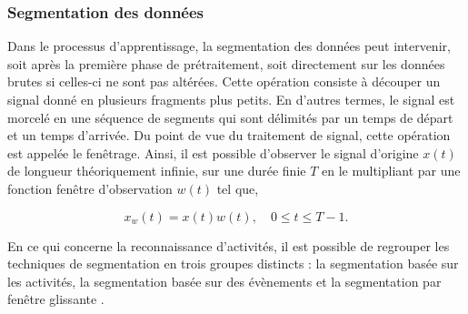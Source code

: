\subsubsection{Segmentation des données}

Dans le processus d'apprentissage, la segmentation des données peut intervenir, soit après la première phase de prétraitement, soit directement sur les données brutes si celles-ci ne sont pas altérées. Cette opération consiste à découper un signal donné en plusieurs fragments plus petits. En d'autres termes, le signal est morcelé en une séquence de segments qui sont délimités par un temps de départ et un temps d'arrivée. Du point de vue du traitement de signal, cette opération est appelée le fenêtrage. Ainsi, il est possible d'observer le signal d'origine $x\left(t\right)$ de longueur théoriquement infinie, sur une durée finie $T$ en le multipliant par une fonction fenêtre d'observation $w\left(t\right)$ tel que,




\begin{equation}
    x_w\left(t\right) = x\left(t\right)w\left(t\right), \quad 0 \leq t \leq T - 1 .
\end{equation}

En ce qui concerne la reconnaissance d'activités, il est possible de regrouper les techniques de segmentation en trois groupes distincts : la segmentation basée sur les activités, la segmentation basée sur des évènements et la segmentation par fenêtre glissante \citep{Banos2014}.

